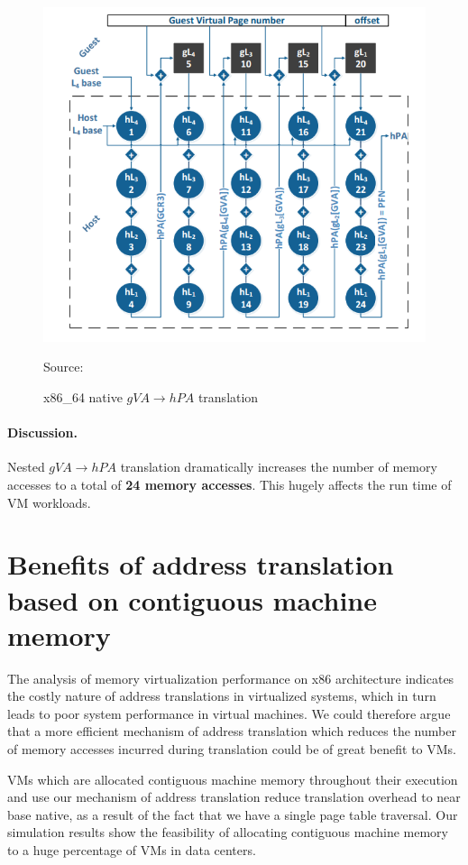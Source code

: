 \documentclass[sigconf]{sigplanconf}
\begin{document}
     \begin{figure}[!h]
     	\centering 
     	\includegraphics[scale=0.35]{2dtrans.png}
     	\caption{x86\_64 native $gVA \rightarrow hPA$ translation}{Source: \cite{dvmt}}
     	\label{fig:2d}
     \end{figure}
     
     \paragraph{Discussion.} Nested $gVA \rightarrow hPA$ translation dramatically increases the number of memory accesses to a total of \textbf{24 memory accesses}. This hugely affects the run time of VM workloads.
      \section{Benefits of address translation based on contiguous machine memory}
      The analysis of memory virtualization performance on x86 architecture indicates the costly nature of address translations in virtualized systems, which in turn leads to poor system performance in virtual machines. We could therefore argue that a more efficient mechanism of address translation which reduces the number of memory accesses incurred during translation could be of great benefit to VMs.
      
      VMs which are allocated contiguous machine memory throughout their execution and use our mechanism of address translation reduce translation overhead to near base native, as a result of the fact that we have a single page table traversal. Our simulation results show the feasibility of allocating contiguous machine memory to a huge percentage of VMs in data centers.
            
\end{document}

